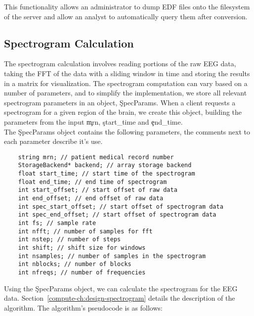 This functionality allows an administrator to dump EDF files onto the
filesystem of the server and allow an analyst to automatically query them after
conversion.

\subsection{Spectrogram Calculation}\label{compute-ch:implementation-spectrogram}

The spectrogram calculation involves reading portions of the raw EEG data,
taking the FFT of the data with a sliding window in time and storing the
results in a matrix for visualization. The spectrogram computation can vary
based on a number of parameters, and to simplify the implementation, we store
all relevant spectrogram parameters in an object, \c{SpecParams}. When a client
requests a spectrogram for a given region of the brain, we create this object,
building the parameters from the input \c{mrn}, \c{start\_time} and
\c{end\_time}. \\

The \c{SpecParams} object contains the following parameters, the comments next
to each parameter describe it's use.

\begin{lstlisting}
    string mrn; // patient medical record number
    StorageBackend* backend; // array storage backend
    float start_time; // start time of the spectrogram
    float end_time; // end time of spectrogram
    int start_offset; // start offset of raw data
    int end_offset; // end offset of raw data
    int spec_start_offset; // start offset of spectrogram data
    int spec_end_offset; // start offset of spectrogram data
    int fs; // sample rate
    int nfft; // number of samples for fft
    int nstep; // number of steps
    int shift; // shift size for windows
    int nsamples; // number of samples in the spectrogram
    int nblocks; // number of blocks
    int nfreqs; // number of frequencies
\end{lstlisting}

Using the \c{SpecParams} object, we can calculate the spectrogram for the EEG
data. Section~\ref{compute-ch:design-spectrogram} details the description of
the algorithm. The algorithm's pseudocode is as follows:

